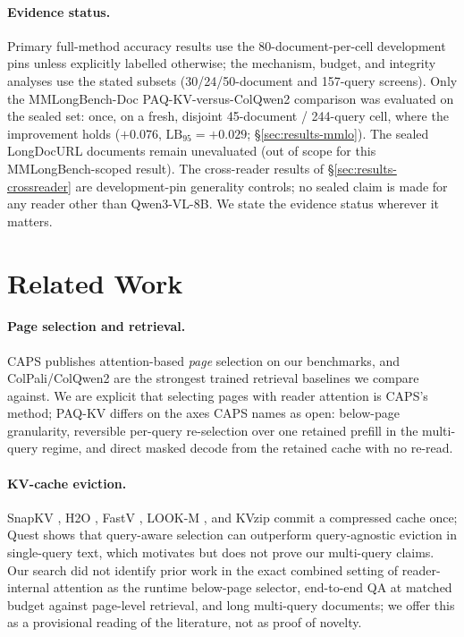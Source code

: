 \documentclass[letterpaper]{article} %
\newcommand{\paqc}{\textsc{PAQ-KV}}
\newcommand{\lb}{\mathrm{LB}_{95}}
\begin{document}
\paragraph{Evidence status.} Primary full-method accuracy results use the 80-document-per-cell development pins unless explicitly labelled otherwise; the mechanism, budget, and integrity analyses use the stated subsets (30/24/50-document and 157-query screens). Only the MMLongBench-Doc \paqc{}-versus-ColQwen2 comparison was evaluated on the sealed set: once, on a fresh, disjoint 45-document / 244-query cell, where the improvement holds ($+0.076$, $\lb=+0.029$; \S\ref{sec:results-mmlo}). The sealed LongDocURL documents remain unevaluated (out of scope for this MMLongBench-scoped result). The cross-reader results of \S\ref{sec:results-crossreader} are development-pin generality controls; no sealed claim is made for any reader other than Qwen3-VL-8B. We state the evidence status wherever it matters.

\section{Related Work}\label{sec:related}

\paragraph{Page selection and retrieval.} CAPS \citep{zhu2026caps} publishes attention-based \emph{page} selection on our benchmarks, and ColPali/ColQwen2 \citep{faysse2025colpali} are the strongest trained retrieval baselines we compare against. We are explicit that selecting pages with reader attention is CAPS's method; \paqc{} differs on the axes CAPS names as open: below-page granularity, reversible per-query re-selection over one retained prefill in the multi-query regime, and direct masked decode from the retained cache with no re-read.

\paragraph{KV-cache eviction.} SnapKV \citep{li2024snapkv}, H2O \citep{zhang2023h2o}, FastV \citep{chen2024fastv}, LOOK-M \citep{wan2024lookm}, and KVzip \citep{kim2025kvzip} commit a compressed cache once; Quest \citep{tang2024quest} shows that query-aware selection can outperform query-agnostic eviction in single-query text, which motivates but does not prove our multi-query claims. Our search did not identify prior work in the exact combined setting of reader-internal attention as the runtime below-page selector, end-to-end QA at matched budget against page-level retrieval, and long multi-query documents; we offer this as a provisional reading of the literature, not as proof of novelty.
\end{document}
